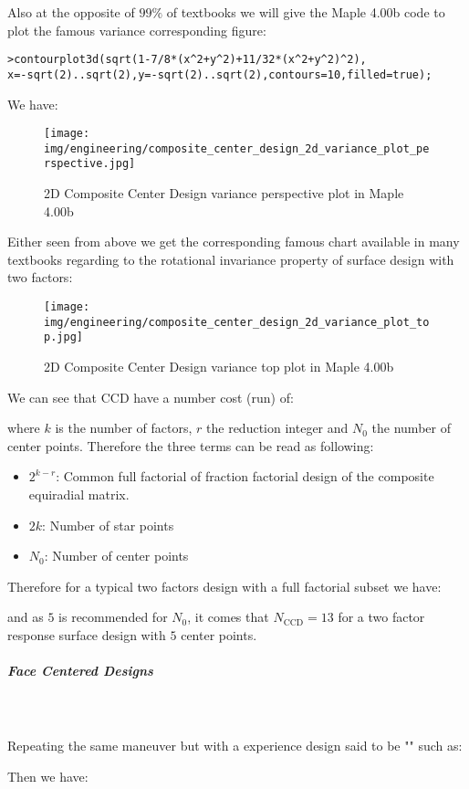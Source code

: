 	Also at the opposite of $99\%$ of textbooks we will give the Maple 4.00b code to plot the famous variance corresponding figure:

	\texttt{>contourplot3d(sqrt(1-7/8*(x\string^2+y\string^2)+11/32*(x\string^2+y\string^2)\string^2),\\x=-sqrt(2)..sqrt(2),y=-sqrt(2)..sqrt(2),contours=10,filled=true);}
	
	We have:
	\begin{figure}[H]
		\centering
		\texttt{[image: img/engineering/composite\_center\_design\_2d\_variance\_plot\_perspective.jpg]}	
		\caption{2D Composite Center Design variance perspective plot in Maple 4.00b}
	\end{figure}
	Either seen from above we get the corresponding famous chart available in many textbooks regarding to the rotational invariance property of surface design with two factors:
	\begin{figure}[H]
		\centering
		\texttt{[image: img/engineering/composite\_center\_design\_2d\_variance\_plot\_top.jpg]}	
		\caption{2D Composite Center Design variance top plot in Maple 4.00b}
	\end{figure}
	We can see that CCD have a number cost (run) of:
	
	where $k$ is the number of factors, $r$ the reduction integer and $N_0$ the number of center points. Therefore the three terms can be read as following:
	\begin{itemize}
		\item $2^{k-r}$: Common full factorial of fraction factorial design of the  composite equiradial matrix.

		\item $2k$: Number of star points

		\item $N_0$: Number of center points
	\end{itemize}
	Therefore for a typical two factors design with a full factorial subset we have:
	
	and as $5$ is recommended for $N_0$, it comes that $N_{\text{CCD}}=13$ for a two factor response surface design with $5$ center points.
	
	\pagebreak
	\subparagraph{Face Centered Designs}\mbox{}\\\\
	Repeating the same maneuver but with a experience design said to be "" such as:
	
	Then we have:
	
